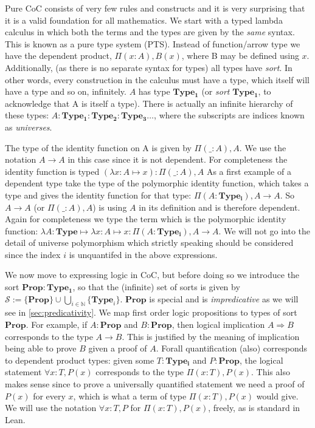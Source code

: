 Pure CoC consists of very few rules and constructs and it is very surprising that it is a valid foundation for all mathematics. We start with a typed lambda calculus in which both the
terms and the types are given by the \emph{same} syntax. This is known as a pure type system (PTS). Instead of function/arrow type we have the dependent product, $\Pi (x : A), B(x)$, where B may be defined using $x$. Additionally,
(as there is no separate syntax for types) all types have \emph{sort}. In other words, every construction in the calculus must have a type, which itself will have a type and so on, infinitely.
$A$ has type $\mathbf{Type_1}$ (or \emph{sort} $\mathbf{Type_1}$, to acknowledge that A is itself a type). There is actually an infinite hierarchy of these types:
$A : \mathbf{Type_1} : \mathbf{Type_2} : \mathbf{Type_3} \ldots$, where the subscripts are indices known as \emph{universes}.

The type of the identity function on A is given by $\Pi (\_ : A), A$. We use the notation $A \to A$ in this case since it is not dependent. For completeness the identity function is typed
$(\lambda x : A \mapsto x) : \Pi (\_ : A), A$
As a first example of a dependent type take the
type of the polymorphic identity function, which takes a type and gives the identity function for that type: $\Pi (A : \mathbf{Type_i}), A \to A$. So $A \to A$ (or $\Pi (\_ : A), A$) is using $A$ in
its definition and is therefore dependent. Again for completeness we type the term which is the polymorphic identity function: 
$\lambda A : \mathbf{Type} \mapsto \lambda x : A \mapsto x : \Pi (A : \mathbf{Type_i}), A \to A$. We will not go into the detail of universe polymorphism which
strictly speaking should be considered since the index $i$ is unquantifed in the above expressions.

We now move to expressing logic in CoC, but before doing so we introduce the sort $\mathbf{Prop} : \mathbf{Type_1}$, so that the (infinite) set of sorts is
given by $\mathcal{S} := \{\mathbf{Prop}\} \cup \bigcup_{i\in\mathbb{N}}\{\mathbf{Type}_i\}$. $\mathbf{Prop}$ is special and is \emph{impredicative} as we will see in \ref{sec:predicativity}.
We map first order logic propositions to types of sort $\mathbf{Prop}$. For example, if $A : \mathbf{Prop}$ and $B : \mathbf{Prop}$, then logical implication $A \Rightarrow B$ corresponds
to the type $A \to B$. This is justified by the meaning of implication being able to prove $B$ given a proof of $A$. Forall quantification (also) corresponds to dependent product types:
given some $T : \mathbf{Type_i}$ and $P : \mathbf{Prop}$, the logical statement $\forall x : T, P(x)$ corresponds to the type $\Pi (x : T), P(x)$. This also makes sense since to prove a
universally quantified statement we need a proof of $P(x)$ for every $x$, which is what a term of type $\Pi (x : T), P(x)$ would give. We will use the notation $\forall x : T, P$ for
$\Pi (x : T), P(x)$, freely, as is standard in Lean.

